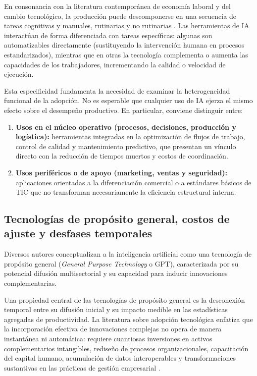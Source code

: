 \documentclass[12pt,a4paper]{article}
\begin{document}
En consonancia con la literatura contemporánea de economía laboral y del cambio tecnológico, la producción puede descomponerse en una secuencia de tareas cognitivas y manuales, rutinarias y no rutinarias \citep{acemoglu2018race}. Las herramientas de IA interactúan de forma diferenciada con tareas específicas: algunas son automatizables directamente (sustituyendo la intervención humana en procesos estandarizados), mientras que en otras la tecnología complementa o aumenta las capacidades de los trabajadores, incrementando la calidad o velocidad de ejecución.

Esta especificidad fundamenta la necesidad de examinar la heterogeneidad funcional de la adopción. No es esperable que cualquier uso de IA ejerza el mismo efecto sobre el desempeño productivo. En particular, conviene distinguir entre:

\begin{enumerate}

    \item \textbf{Usos en el núcleo operativo (procesos, decisiones, producción y logística):} herramientas integradas en la optimización de flujos de trabajo, control de calidad y mantenimiento predictivo, que presentan un vínculo directo con la reducción de tiempos muertos y costos de coordinación.

    \item \textbf{Usos periféricos o de apoyo (marketing, ventas y seguridad):} aplicaciones orientadas a la diferenciación comercial o a estándares básicos de TIC que no transforman necesariamente la eficiencia estructural interna.

\end{enumerate}

\subsection{Tecnologías de propósito general, costos de ajuste y desfases temporales}

Diversos autores conceptualizan a la inteligencia artificial como una tecnología de propósito general (\textit{General Purpose Technology} o GPT), caracterizada por su potencial difusión multisectorial y su capacidad para inducir innovaciones complementarias.

Una propiedad central de las tecnologías de propósito general es la desconexión temporal entre su difusión inicial y su impacto medible en las estadísticas agregadas de productividad. La literatura sobre adopción tecnológica enfatiza que la incorporación efectiva de innovaciones complejas no opera de manera instantánea ni automática: requiere cuantiosas inversiones en activos complementarios intangibles, rediseño de procesos organizacionales, capacitación del capital humano, acumulación de datos interoperables y transformaciones sustantivas en las prácticas de gestión empresarial \citep{bresnahan2002information, brynjolfsson2021productivity}.
\end{document}
